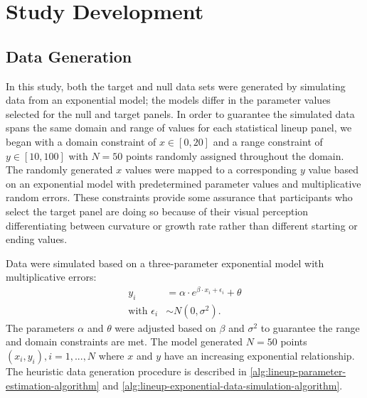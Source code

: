 \documentclass[12pt]{article}
\begin{document}
\hypertarget{study-development}{%
\section{Study Development}\label{study-development}}

\hypertarget{data-generation}{%
\subsection{Data Generation}\label{data-generation}}

In this study, both the target and null data sets were generated by
simulating data from an exponential model; the models differ in the
parameter values selected for the null and target panels. In order to
guarantee the simulated data spans the same domain and range of values
for each statistical lineup panel, we began with a domain constraint of
\(x\in [0,20]\) and a range constraint of \(y\in [10,100]\) with
\(N = 50\) points randomly assigned throughout the domain. The randomly
generated \(x\) values were mapped to a corresponding \(y\) value based
on an exponential model with predetermined parameter values and
multiplicative random errors. These constraints provide some assurance
that participants who select the target panel are doing so because of
their visual perception differentiating between curvature or growth rate
rather than different starting or ending values.

Data were simulated based on a three-parameter exponential model with
multiplicative errors: \begin{align}
y_i & = \alpha\cdot e^{\beta\cdot x_i + \epsilon_i} + \theta \\
\text{with } \epsilon_i & \sim N(0, \sigma^2). \nonumber
\end{align} The parameters \(\alpha\) and \(\theta\) were adjusted based
on \(\beta\) and \(\sigma^2\) to guarantee the range and domain
constraints are met. The model generated \(N = 50\) points
\((x_i, y_i), i = 1,...,N\) where \(x\) and \(y\) have an increasing
exponential relationship. The heuristic data generation procedure is
described in \cref{alg:lineup-parameter-estimation-algorithm} and
\cref{alg:lineup-exponential-data-simulation-algorithm}.
\end{document}
